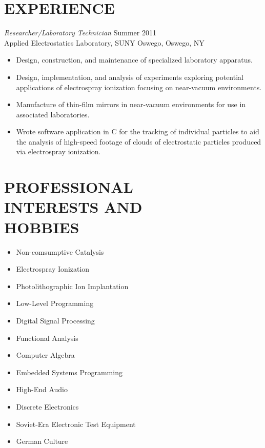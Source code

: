 \documentclass[line,margin]{res}
\begin{document}
\begin{resume}
\section{EXPERIENCE} {\sl Researcher/Laboratory Technician} \hfill Summer 2011 \\
                Applied Electrostatics Laboratory, 
                SUNY Oswego, Oswego, NY
                 \begin{itemize}  \itemsep -2pt %
                \item   Design, construction, and maintenance of 
				        specialized laboratory apparatus.
                \item   Design, implementation, and analysis of
				        experiments exploring potential applications
						of electrospray ionization focusing
						on near-vacuum environments.
				\item   Manufacture of thin-film mirrors in
				        near-vacuum environments for use in
						associated laboratories.
				\item   Wrote software application in C
						for the tracking of individual particles
						to aid the analysis of high-speed footage
						of clouds of electrostatic particles
						produced via electrospray ionization.
                \end{itemize}

\section{PROFESSIONAL \\ INTERESTS AND \\ HOBBIES}
				\begin{itemize} \itemsep -2pt
				\item	Non-comsumptive Catalysis
				\item	Electrospray Ionization
				\item	Photolithographic Ion Implantation
				\item	Low-Level Programming
				\item	Digital Signal Processing
				\item	Functional Analysis
				\item	Computer Algebra
				\item	Embedded Systems Programming
				\item	High-End Audio
				\item	Discrete Electronics
				\item	Soviet-Era Electronic Test Equipment
				\item	German Culture
				\end{itemize}


\end{resume}
\end{document}
